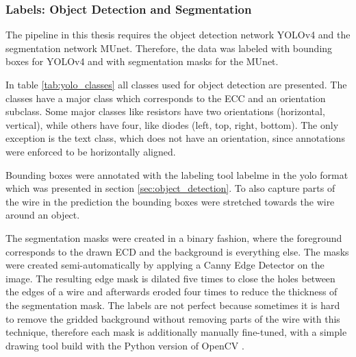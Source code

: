 \subsubsection{Labels: Object Detection and Segmentation}

The pipeline in this thesis requires the object detection network \ac{YOLOv4} and the segmentation network \ac{MUnet}.
Therefore, the data was labeled with bounding boxes for \ac{YOLOv4} and with segmentation masks for the \ac{MUnet}.

In table \ref{tab:yolo_classes} all classes used for object detection are presented.
The classes have a major class which corresponds to the \ac{ECC} and an orientation subclass.
Some major classes like resistors have two orientations (horizontal, vertical), while others have four, like diodes (left, top, right, bottom).
The only exception is the text class, which does not have an orientation, since annotations were enforced to be horizontally aligned.

Bounding boxes were annotated with the labeling tool labelme \cite{labelme} in the yolo format which was presented in section \ref{sec:object_detection}.
To also capture parts of the wire in the prediction the bounding boxes were stretched towards the wire around an object.

The segmentation masks were created in a binary fashion, where the foreground corresponds to the drawn \ac{ECD} and the background is everything else.
The masks were created semi-automatically by applying a Canny Edge Detector \cite{canny_edge} on the image.
The resulting edge mask is dilated five times to close the holes between the edges of a wire and afterwards eroded four times to reduce the thickness of the segmentation mask.
The labels are not perfect because sometimes it is hard to remove the gridded background without removing parts of the wire with this technique, therefore each mask is additionally manually fine-tuned, with a simple drawing tool build with the Python version of OpenCV \cite{opencv}.

